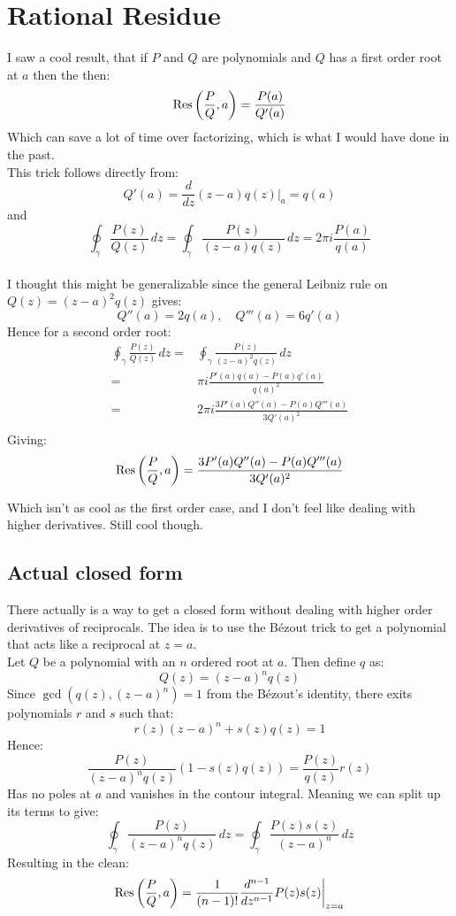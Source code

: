 
\section{Rational Residue}
\label{showcase:rational_residue}
I saw a cool result,
that if $P$ and $Q$ are polynomials and $Q$ has a first order root at $a$ then the then:
\[\operatorname{Res}\left(\frac{P}{Q},a\right) = \frac{P(a)}{Q'(a)} \]
Which can save a lot of time over factorizing, 
which is what I would have done in the past.
\\

This trick follows directly from:
\[Q'(a)=\frac{d}{dz}(z-a)q(z)\bigg|_a = q(a)\]
and
\[\oint_\gamma\frac{P(z)}{Q(z)}\,dz = \oint_\gamma \frac{P(z)}{(z-a)q(z)}\,dz = 2\pi i\frac{P(a)}{q(a)}\]
\\

I thought this might be generalizable since the general Leibniz rule on $Q(z)=(z-a)^2q(z)$ gives:
\[Q''(a)=2q(a),\quad Q'''(a)=6q'(a)\]
Hence for a second order root:
\begin{equation*}
\begin{aligned}
	\oint_\gamma\frac{P(z)}{Q(z)}\,dz =& \oint_\gamma \frac{P(z)}{(z-a)^2q(z)}\,dz \\
	=& \pi i\frac{P'(a)q(a)-P(a)q'(a)}{q(a)^2}\\
	=& 2\pi i\frac{3P'(a)Q''(a)-P(a)Q'''(a)}{3Q'(a)^2}\\
\end{aligned}
\end{equation*}
Giving:
\[\operatorname{Res}\left(\frac{P}{Q},a\right)= \frac{3P'(a)Q''(a)-P(a)Q'''(a)}{3Q'(a)^2} \]

Which isn't as cool as the first order case,
and I don't feel like dealing with higher derivatives.
Still cool though.

\subsection{Actual closed form}
There actually is a way to get a closed form without dealing with higher order derivatives of reciprocals.
The idea is to use the Bézout trick to get a polynomial that acts like a reciprocal at $z=a$.
\\

Let $Q$ be a polynomial with an $n$ ordered root at $a$.
Then define $q$ as:
\[Q(z) = (z-a)^nq(z)\]
Since $\gcd(q(z),(z-a)^n) = 1$ from the Bézout's identity, there exits polynomials $r$ and $s$ such that:
\[r(z)(z-a)^n+s(z)q(z)=1\]
Hence:
\[\frac{P(z)}{(z-a)^nq(z)}(1-s(z)q(z)) = \frac{P(z)}{q(z)}r(z)\]
Has no poles at $a$ and vanishes in the contour integral.
Meaning we can split up its terms to give:
\[\oint_\gamma\frac{P(z)}{(z-a)^nq(z)}\,dz = \oint_\gamma \frac{P(z)s(z)}{(z-a)^n}\,dz\]
Resulting in the clean:
\[\operatorname{Res}\left(\frac{P}{Q},a\right) = \frac{1}{(n-1)!}\frac{d^{n-1}}{dz^{n-1}}P(z)s(z)\bigg|_{z=a}\]

